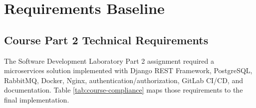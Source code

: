 \documentclass[12pt,a4paper]{report}
\begin{document}
\chapter{Requirements Baseline}
\label{ch:requirements-baseline}

\section{Course Part 2 Technical Requirements}
\label{sec:course-requirements}

The Software Development Laboratory Part 2 assignment required a microservices
solution implemented with Django REST Framework, PostgreSQL, RabbitMQ, Docker,
Nginx, authentication/authorization, GitLab CI/CD, and documentation. Table
\ref{tab:course-compliance} maps those requirements to the final implementation.
\end{document}
